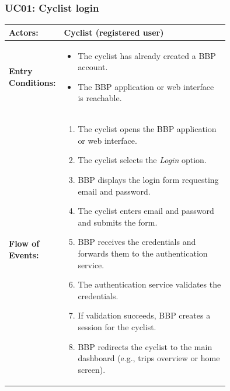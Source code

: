 \subsubsection{UC01: Cyclist login}
\label{subsubsec:cyclist-login}
\begin{center}
    \begin{longtable}{|l|p{0.75\linewidth}|}
        \hline
        \textbf{Actors:}           & Cyclist (registered user)                                                      \\
        \hline
        \textbf{Entry Conditions:} & \begin{itemize}
                                        \item The cyclist has already created a BBP account.
                                        \item The BBP application or web interface is reachable.
                                    \end{itemize}                                                                    \\
        \hline
        \textbf{Flow of Events:}   & \begin{enumerate}
                                        \item The cyclist opens the BBP application or web interface.
                                        \item The cyclist selects the \emph{Login} option.
                                        \item BBP displays the login form requesting email and password.
                                        \item The cyclist enters email and password and submits the form.
                                        \item BBP receives the credentials and forwards them to the authentication service.
                                        \item The authentication service validates the credentials.
                                        \item If validation succeeds, BBP creates a session for the cyclist.
                                        \item BBP redirects the cyclist to the main dashboard (e.g., trips overview or home screen).
                                     \end{enumerate}                                                                 \\

\end{longtable}
\end{center}
